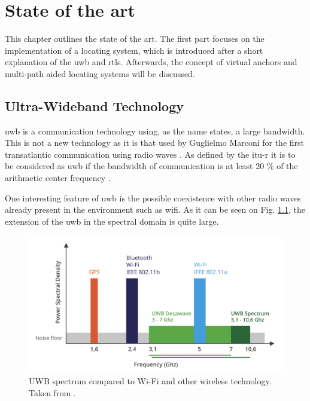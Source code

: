 % 			 
%
%

\chapter{State of the art}
\label{stateoftheart}

This chapter outlines the state of the art. The first part focuses on the implementation of a locating system, which is introduced after a short explanation of the \gls{uwb} and \gls{rtls}. Afterwards, the concept of virtual anchors and multi-path aided locating systems will be discussed.


\section{Ultra-Wideband Technology}
\label{uwb}
\gls{uwb} is a communication technology using, as the name states, a large bandwidth. This is not a new technology as it is that used by Guglielmo Marconi for the first transatlantic communication using radio waves \cite{nekoogar2005uwb}. As defined by the \gls{itu-r} it is to be considered as \gls{uwb} if the bandwidth of communication is at least 20 \% of the arithmetic center frequency \cite{itur2006characteristics}.
\vspace{2mm}

One interesting feature of \gls{uwb} is the possible coexistence with other radio waves already present in the environment such as \gls{wifi}. As it can be seen on Fig. \ref{fig:UWB_Techonology}, the extension of the \gls{uwb} in the spectral domain is quite large. 

\begin{figure}[H]
\includegraphics[width=.6\linewidth]{Images/uwb_bandwidth.png}
\centering
\caption{UWB spectrum compared to Wi-Fi and other wireless technology. Taken from \cite{itur2006characteristics}.}
\label{fig:UWB_Techonology}
\end{figure} 

